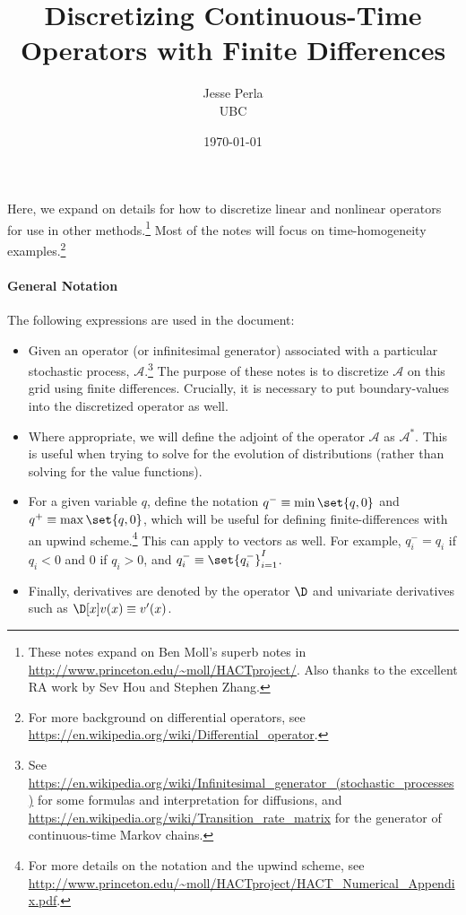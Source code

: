 \documentclass[11pt]{etk-article}
\begin{document}
\title{Discretizing Continuous-Time Operators with Finite Differences}
\author{Jesse Perla\\UBC}
\date{\today}
\maketitle
 Here, we expand on details for how to discretize linear and nonlinear operators for use in other methods.\footnote{These notes expand on Ben Moll's superb notes in \url{http://www.princeton.edu/~moll/HACTproject/}. Also thanks to the excellent RA work by Sev Hou and Stephen Zhang.}  Most of the notes will focus on time-homogeneity examples.\footnote{For more background on differential operators, see \url{https://en.wikipedia.org/wiki/Differential_operator}.}
\paragraph{General Notation} The following expressions are used in the document:
\begin{itemize}
	\item Given an operator (or infinitesimal generator) associated with a particular stochastic process, $\mathcal{A}$.\footnote{See \url{https://en.wikipedia.org/wiki/Infinitesimal_generator_(stochastic_processes)} for some formulas and interpretation for diffusions, and \url{https://en.wikipedia.org/wiki/Transition_rate_matrix} for the generator of continuous-time Markov chains.}  The purpose of these notes is to discretize $\mathcal{A}$ on this grid using finite differences.  Crucially, it is necessary to put boundary-values into the discretized operator as well. 
	\item Where appropriate, we will define the adjoint of the operator $\mathcal{A}$ as $\mathcal{A}^*$.  This is useful when trying to solve for the evolution of distributions (rather than solving for the value functions).
	\item For a given variable $q$, define the notation $q^{-} \equiv \min\set{q,0}$ and $q^{+} \equiv \max\set{q,0}$, which will be useful for defining finite-differences with an upwind scheme.\footnote{For more details on the notation and the upwind scheme, see \url{http://www.princeton.edu/~moll/HACTproject/HACT_Numerical_Appendix.pdf}.}   This can apply to vectors as well. For example, $q_i^{-} = q_i$ if $q_i < 0$ and $0$ if $q_i > 0$, and $q_i^{-} \equiv \set{q^{-}_i}_{i=1}^{I}$.
	\item Finally,  derivatives are denoted by the operator $\D$ and univariate derivatives such as $\D[x]v(x) \equiv v'(x)$.	
\end{itemize}
\end{document}
